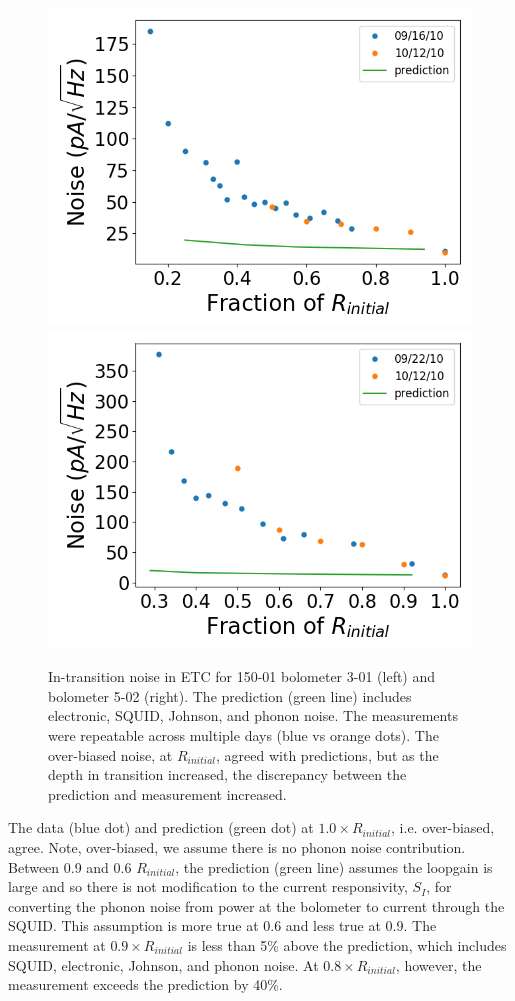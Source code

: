 \begin{figure}[ht!]
\begin{center}
\includegraphics[width=0.48\columnwidth]{figures/b54w2c0_it_noise.png}
\includegraphics[width=0.48\columnwidth]{figures/b54w2c3_it_noise.png}
\caption{In-transition noise in \ac{ETC} for 150-01 bolometer 3-01 (left) and bolometer 5-02 (right). The prediction (green line) includes electronic, \ac{SQUID}, Johnson, and phonon noise. The measurements were repeatable across multiple days (blue vs orange dots). The over-biased noise, at $R_{initial}$, agreed with predictions, but as the depth in transition increased, the discrepancy between the prediction and measurement increased. 
\label{fig:etc_it_noise} }
\end{center}
\end{figure}

The data (blue dot) and prediction (green dot) at $1.0 \times R_{initial}$, i.e. over-biased, agree. 
Note, over-biased, we assume there is no phonon noise contribution. 
Between 0.9 and 0.6 $R_{initial}$, the prediction (green line) assumes the loopgain is large and so there is not modification to the current responsivity, $S_{I}$, for converting the phonon noise from power at the bolometer to current through the \ac{SQUID}.
This assumption is more true at 0.6 and less true at 0.9. 
The measurement at $0.9 \times R_{initial}$ is less than 5\% above the prediction, which includes \ac{SQUID}, electronic, Johnson, and phonon noise. 
At $0.8 \times R_{initial}$, however, the measurement exceeds the prediction by 40\%. 


